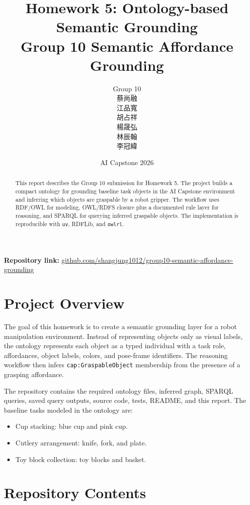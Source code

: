\documentclass[a4paper, 11pt]{article}
\title{\textbf{Homework 5: Ontology-based Semantic Grounding}\\
\large Group 10 Semantic Affordance Grounding}
\author{Group 10\\蔡尚融\\江品寬\\胡占祥\\楊晟弘\\林辰翰\\李冠緯}
\date{AI Capstone 2026}
\begin{document}
\maketitle

\begin{abstract}
This report describes the Group 10 submission for Homework 5. The project builds a compact ontology for grounding baseline task objects in the AI Capstone environment and inferring which objects are graspable by a robot gripper. The workflow uses RDF/OWL for modeling, OWL/RDFS closure plus a documented rule layer for reasoning, and SPARQL for querying inferred graspable objects. The implementation is reproducible with \texttt{uv}, RDFLib, and \texttt{owlrl}.
\end{abstract}

\noindent\textbf{Repository link:}
\href{https://github.com/shangjung1012/group10-semantic-affordance-grounding}{github.com/shangjung1012/group10-semantic-affordance-grounding}

\section{Project Overview}

The goal of this homework is to create a semantic grounding layer for a robot manipulation environment. Instead of representing objects only as visual labels, the ontology represents each object as a typed individual with a task role, affordances, object labels, colors, and pose-frame identifiers. The reasoning workflow then infers \texttt{cap:GraspableObject} membership from the presence of a grasping affordance.

The repository contains the required ontology files, inferred graph, SPARQL queries, saved query outputs, source code, tests, README, and this report. The baseline tasks modeled in the ontology are:

\begin{itemize}
    \item Cup stacking: blue cup and pink cup.
    \item Cutlery arrangement: knife, fork, and plate.
    \item Toy block collection: toy blocks and basket.
\end{itemize}

\section{Repository Contents}
\end{document}
